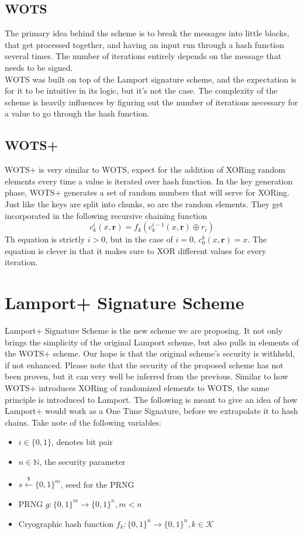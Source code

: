 \documentclass[]{scrartcl}
\begin{document}
\subsection*{WOTS}
The primary idea behind the scheme is to break the messages into little blocks, that get processed together, and having an input run through a hash function several times. The number of iterations entirely depends on the message that needs to be signed.\\
WOTS was built on top of the Lamport signature scheme, and the expectation is for it to be intuitive in its logic, but it's not the case. The complexity of the scheme is heavily influences by figuring out the number of iterations necessary for a value to go through the hash function.

\subsection*{WOTS+}
WOTS+ is very similar to WOTS, expect for the addition of XORing random elements every time a value is iterated over hash function. In the key generation phase, WOTS+ generates a set of random numbers that will serve for XORing. Just like the keys are split into chunks, so are the random elements. They get incorporated in the following recursive chaining function
\begin{equation}
c_{k}^{i}(x,\textbf{r}) = f_{k}(c_{k}^{i-1}(x,\textbf{r}) \oplus r_{i})
\end{equation}
Th equation is strictly $i > 0$, but in the case of $i = 0$, $c_{0}^{k}(x,\textbf{r}) = x$. The equation is clever in that it makes sure to XOR different values for every iteration. 

\section*{Lamport+ Signature Scheme}
Lamport+ Signature Scheme is the new scheme we are proposing. It not only brings the simplicity of the original Lamport scheme, but also pulls in elements of the WOTS+ scheme. Our hope is that the original scheme's security is withheld, if not enhanced. Please note that the security of the proposed scheme has not been proven, but it can very well be inferred from the previous. Similar to how WOTS+ introduces XORing of randomized elements to WOTS, the same principle is introduced to Lamport. The following is meant to give an idea of how Lamport+ would work as a One Time Signature, before we extrapolate it to hash chains. Take note of the following variables:
\begin{itemize}
	\item $i \in \{0,1\}$, denotes bit pair
	\item $n \in \mathbb{N}$, the security parameter 
	\item $s \xleftarrow{\$} \{0,1\}^m$, seed for the PRNG
	\item PRNG $g : \{0,1\}^m \rightarrow \{0,1\}^n, m < n$
	\item Cryographic hash function $f_k : \{0,1\}^n \rightarrow \{0,1\}^n, k \in \mathcal{K}$
\end{itemize}
\end{document}
